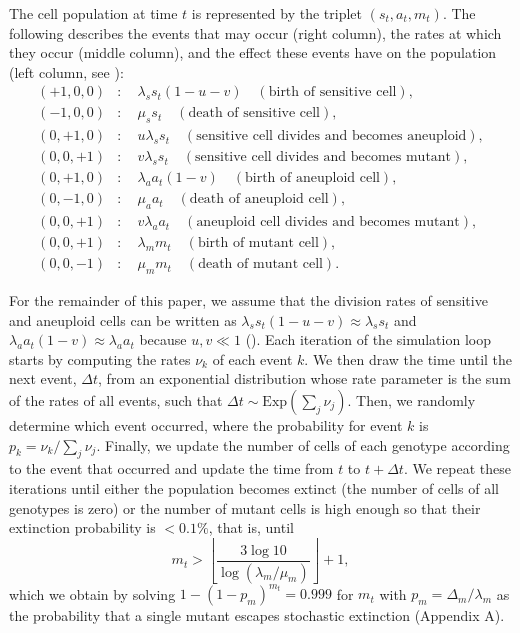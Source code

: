 \documentclass[12pt]{extarticle}
\begin{document}
The cell population at time $t$ is represented by the triplet $\left(s_t,a_t,m_t\right)$. The following describes the events that may occur (right column), the rates at which they occur (middle column), and the effect these events have on the population (left column, see ):
\[
\begin{aligned}
(+1,0,0)&:\quad \lambda_ss_t\left(1-u-v\right)\quad\left(\text{birth of sensitive cell}\right),\\
(-1,0,0)&:\quad \mu_ss_t\quad\left(\text{death of sensitive cell}\right),\\
(0,+1,0)&:\quad u\lambda_ss_t\quad\left(\text{sensitive cell divides and becomes aneuploid}\right),\\
(0,0,+1)&:\quad v\lambda_ss_t\quad\left(\text{sensitive cell divides and becomes mutant}\right),\\
(0,+1,0)&:\quad \lambda_aa_t\left(1-v\right)\quad\left(\text{birth of aneuploid cell}\right),\\
(0,-1,0)&:\quad \mu_aa_t\quad\left(\text{death of aneuploid cell}\right),\\
(0,0,+1)&:\quad v\lambda_aa_t\quad\left(\text{aneuploid cell divides and becomes mutant}\right),\\
(0,0,+1)&:\quad \lambda_mm_t\quad\left(\text{birth of mutant cell}\right),\\
(0,0,-1)&:\quad \mu_mm_t\quad\left(\text{death of mutant cell}\right).
\end{aligned}
\]

For the remainder of this paper, we assume that the division rates of sensitive and aneuploid cells can be written as $\lambda_ss_t\left(1-u-v\right)\approx \lambda_ss_t$ and $\lambda_aa_t\left(1-v\right)\approx\lambda_aa_t$ because $u,v\ll1$ ().
Each iteration of the simulation loop starts by computing the rates $\nu_k$ of each event $k$.
We then draw the time until the next event, $\Delta t$, from an exponential distribution whose rate parameter is the sum of the rates of all events, such that $\Delta t \sim \text{Exp}(\sum_j \nu_j)$.
Then, we randomly determine which event occurred, where the probability for event $k$ is $p_k = \nu_k/\sum_j \nu_j$.
Finally, we update the number of cells of each genotype according to the event that occurred and update the time from $t$ to $t+\Delta t$.
We repeat these iterations until either the population becomes extinct (the number of cells of all genotypes is zero) or the number of mutant cells is high enough so that their extinction probability is $<0.1\%$, that is, until
\begin{equation*}
m_t > \left\lfloor\frac{3\log{10}}{\log{\left(\lambda_m / \mu_m\right)}}\right\rfloor + 1 ,
\end{equation*}
which we obtain by solving $1-(1-p_m)^{m_t}=0.999$ for $m_t$ with $p_m=\Delta_m/\lambda_m$ as the probability that a single mutant escapes stochastic extinction (Appendix A).
\end{document}
